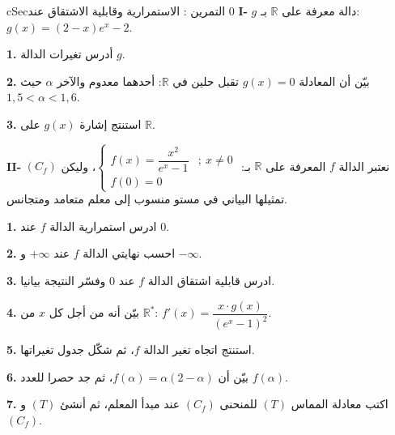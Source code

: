 \documentclass[12pt,a4paper]{article}
\newenvironment{BOX}[2]{\begin{otherlanguage}{english}\begin{arbox}{#1}{#2}}{\end{arbox}\end{otherlanguage}}
\newcounter{exo}
\newenvironment{tamrin}[1]{\stepcounter{exo}\begin{BOX}{cSec}{التمرين \theexo: #1}}{\end{BOX}}
\newcommand{\R}{\mathbb{R}}
\newcommand{\QQ}[1]{\par\smallskip\textbf{#1.} }
\begin{document}
\begin{tamrin}{الاستمرارية وقابلية الاشتقاق عند $0$}
\textbf{I-} $g$ دالة معرفة على $\R$ بـ: $g(x)=(2-x)e^{x}-2$.
\QQ{1} أدرس تغيرات الدالة $g$.
\QQ{2} بيّن أن المعادلة $g(x)=0$ تقبل حلين في $\R$: أحدهما معدوم والآخر $\alpha$ حيث $1{,}5<\alpha<1{,}6$.
\QQ{3} استنتج إشارة $g(x)$ على $\R$.

\textbf{II-} نعتبر الدالة $f$ المعرفة على $\R$ بـ: $\left\{\begin{array}{ll}f(x)=\dfrac{x^{2}}{e^{x}-1}&;\ x\neq0\\[6pt] f(0)=0&\end{array}\right.$، وليكن $(C_f)$ تمثيلها البياني في مستو منسوب إلى معلم متعامد ومتجانس.
\QQ{1} ادرس استمرارية الدالة $f$ عند $0$.
\QQ{2} احسب نهايتي الدالة $f$ عند $+\infty$ و $-\infty$.
\QQ{3} ادرس قابلية اشتقاق الدالة $f$ عند $0$ وفسّر النتيجة بيانيا.
\QQ{4} بيّن أنه من أجل كل $x$ من $\R^{*}$: $f'(x)=\dfrac{x\cdot g(x)}{\left(e^{x}-1\right)^{2}}$.
\QQ{5} استنتج اتجاه تغير الدالة $f$، ثم شكّل جدول تغيراتها.
\QQ{6} بيّن أن $f(\alpha)=\alpha(2-\alpha)$، ثم جد حصرا للعدد $f(\alpha)$.
\QQ{7} اكتب معادلة المماس $(T)$ للمنحنى $(C_f)$ عند مبدأ المعلم، ثم أنشئ $(T)$ و $(C_f)$.
\end{tamrin}
\end{document}
